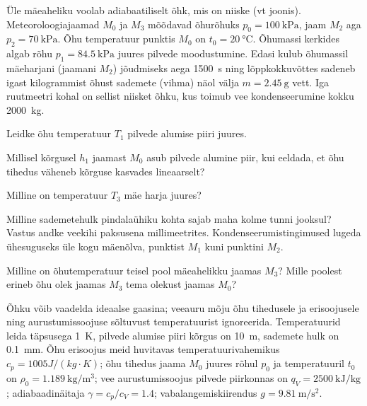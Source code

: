 \documentclass[a4paper,11pt,twocolumn]{article}
\begin{document}
\begin{question}[IPhO 1987][ter1][8cm]
	Üle mäeaheliku voolab adiabaatiliselt õhk, mis on niiske (vt joonis). Meteoroloogiajaamad \( M_0 \) ja \( M_3 \) mõõdavad õhurõhuks \( p_0 = \SI{100}{\kilo\pascal} \), jaam \( M_2 \) aga \( p_2 = \SI{70}{\kilo\pascal} \). Õhu temperatuur punktis \( M_0 \) on \( t_0 = \SI{20}{\degreeCelsius}\). Õhumassi kerkides algab rõhu \( p_1 = \SI{84,5}{\kilo\pascal}\) juures pilvede moodustumine. Edasi kulub õhumassil mäeharjani (jaamani \( M_2 \)) jõudmiseks aega \SI{1500}{\s} ning lõppkokkuvõttes sadeneb igast kilogrammist õhust sademete (vihma) näol välja \( m = \SI{2,45}{\g}\) vett. Iga ruutmeetri kohal on sellist niisket õhku, kus toimub vee kondenseerumine kokku \SI{2000}{\kg}.
	\begin{subquestion}
		\item Leidke õhu temperatuur \( T_1 \) pilvede alumise piiri juures.
		\item Millisel kõrgusel \( h_1 \) jaamast \( M_0 \) asub pilvede alumine piir, kui eeldada, et õhu tihedus väheneb kõrguse kasvades lineaarselt?
		\item Milline on temperatuur \( T_3 \) mäe harja juures?
		\item Milline sademetehulk pindalaühiku kohta sajab maha kolme tunni jooksul? Vastus andke veekihi paksusena millimeetrites. Kondenseerumistingimused lugeda ühesuguseks üle kogu mäenõlva, punktist \( M_1 \) kuni punktini \( M_2 \).
		\item Milline on õhutemperatuur teisel pool mäeahelikku jaamas \( M_3 \)? Mille poolest erineb õhu olek jaamas \( M_3 \) tema olekust jaamas \( M_0 \)?
	\end{subquestion}
	\begin{hint}
		Õhku võib vaadelda ideaalse gaasina; veeauru mõju õhu tihedusele ja erisoojusele ning aurustumissoojuse sõltuvust temperatuurist ignoreerida. Temperatuurid leida täpsusega \SI{1}{\K}, pilvede alumise piiri kõrgus on \SI{10}{\m}, sademete hulk on \SI{0,1}{\mm}. Õhu erisoojus meid huvitavas temperatuurivahemikus \( c_p = 1005 J/(kg · K) \); õhu tihedus jaama \( M_0 \) juures rõhul \( p_0 \) ja temperatuuril \( t_0 \) on \( \rho_0 = \SI{1,189}{\kg\per\m\cubed} \); vee aurustumissoojus pilvede piirkonnas on \( q_V = \SI{2500}{\kJ\per\kg} \); adiabaadinäitaja \( \gamma = c_p/c_V = \num{1,4} \); vabalangemiskiirendus \( g = \SI{9,81}{\m\per\s\squared} \).
	\end{hint}
\end{question}
\end{document}
